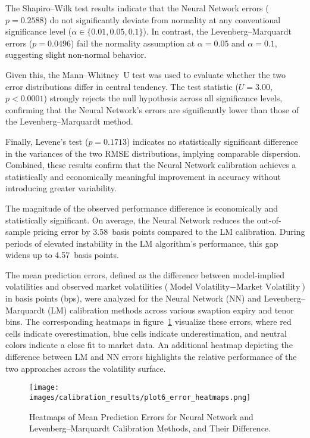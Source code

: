 The Shapiro–Wilk test results indicate that the Neural Network errors (\(p=0.2588\)) do not significantly deviate from normality at any conventional significance level (\(\alpha \in \{0.01, 0.05, 0.1\}\)). In contrast, the Levenberg–Marquardt errors (\(p=0.0496\)) fail the normality assumption at \(\alpha=0.05\) and \(\alpha=0.1\), suggesting slight non-normal behavior.

Given this, the Mann–Whitney~U test was used to evaluate whether the two error distributions differ in central tendency. The test statistic (\(U=3.00\), \(p<0.0001\)) strongly rejects the null hypothesis across all significance levels, confirming that the Neural Network’s errors are significantly lower than those of the Levenberg–Marquardt method.

Finally, Levene’s test (\(p=0.1713\)) indicates no statistically significant difference in the variances of the two RMSE distributions, implying comparable dispersion. Combined, these results confirm that the Neural Network calibration achieves a statistically and economically meaningful improvement in accuracy without introducing greater variability.

The magnitude of the observed performance difference is economically and statistically significant. On average, the Neural Network reduces the out-of-sample pricing error by 3.58~basis points compared to the LM calibration. During periods of elevated instability in the LM algorithm’s performance, this gap widens up to 4.57~basis points.

The mean prediction errors, defined as the difference between model-implied volatilities and observed market volatilities (\(\text{Model Volatility} - \text{Market Volatility}\)) in basis points (bps), were analyzed for the Neural Network (NN) and Levenberg–Marquardt (LM) calibration methods across various swaption expiry and tenor bins. The corresponding heatmaps in figure~\ref{fig:error_heatmaps} visualize these errors, where red cells indicate overestimation, blue cells indicate underestimation, and neutral colors indicate a close fit to market data. An additional heatmap depicting the difference between LM and NN errors highlights the relative performance of the two approaches across the volatility surface.

\begin{figure}[H]
	\centering
	\texttt{[image: images/calibration\_results/plot6\_error\_heatmaps.png]}
	\caption{Heatmaps of Mean Prediction Errors for Neural Network and Levenberg--Marquardt Calibration Methods, and Their Difference.}
	\label{fig:error_heatmaps}
\end{figure}

